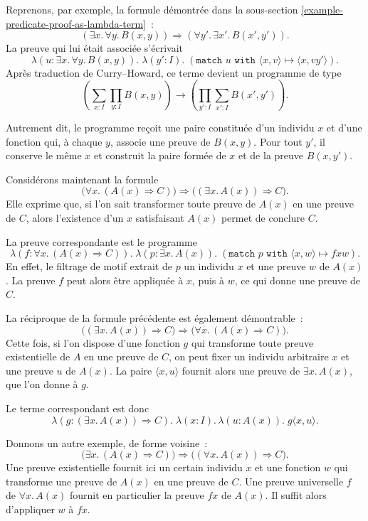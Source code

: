 \thingy
Reprenons, par exemple, la formule démontrée dans la sous-section
\ref{example-predicate-proof-as-lambda-term} :
\[
(\exists x.\,\forall y.\,B(x,y))
\Rightarrow
(\forall y'.\,\exists x'.\,B(x',y')).
\]
La preuve qui lui était associée s'écrivait
\[
\lambda(u:\exists x.\,\forall y.\,B(x,y)).\;
\lambda(y':I).\;
(\texttt{match~}u\texttt{~with~}\langle x,v\rangle\mapsto
\langle x,vy'\rangle).
\]
Après traduction de Curry--Howard, ce terme devient un programme de
type
\[
\left(
  \sum_{x:I}\prod_{y:I} B(x,y)
\right)
\rightarrow
\left(
  \prod_{y':I}\sum_{x':I} B(x',y')
\right).
\]

Autrement dit, le programme reçoit une paire constituée d'un individu
$x$ et d'une fonction qui, à chaque $y$, associe une preuve de
$B(x,y)$.  Pour tout $y'$, il conserve le même $x$ et construit la paire
formée de $x$ et de la preuve $B(x,y')$.

\thingy
Considérons maintenant la formule
\[
\bigl(\forall x.\,(A(x)\Rightarrow C)\bigr)
\Rightarrow
\bigl((\exists x.\,A(x))\Rightarrow C\bigr).
\]
Elle exprime que, si l'on sait transformer toute preuve de $A(x)$ en une
preuve de $C$, alors l'existence d'un $x$ satisfaisant $A(x)$ permet de
conclure $C$.

La preuve correspondante est le programme
\[
\lambda(f:\forall x.\,(A(x)\Rightarrow C)).\;
\lambda(p:\exists x.\,A(x)).\;
(\texttt{match~}p\texttt{~with~}\langle x,w\rangle\mapsto fxw).
\]
En effet, le filtrage de motif extrait de $p$ un individu $x$ et une
preuve $w$ de $A(x)$.  La preuve $f$ peut alors être appliquée à $x$,
puis à $w$, ce qui donne une preuve de $C$.

\thingy
La réciproque de la formule précédente est également démontrable :
\[
\bigl((\exists x.\,A(x))\Rightarrow C\bigr)
\Rightarrow
\bigl(\forall x.\,(A(x)\Rightarrow C)\bigr).
\]
Cette fois, si l'on dispose d'une fonction $g$ qui transforme toute
preuve existentielle de $A$ en une preuve de $C$, on peut fixer un
individu arbitraire $x$ et une preuve $u$ de $A(x)$.  La paire
$\langle x,u\rangle$ fournit alors une preuve de $\exists x.\,A(x)$,
que l'on donne à $g$.

Le terme correspondant est donc
\[
\lambda(g:(\exists x.\,A(x))\Rightarrow C).\;
\lambda(x:I).\,\lambda(u:A(x)).\;
g\langle x,u\rangle.
\]

\thingy
Donnons un autre exemple, de forme voisine :
\[
\bigl(\exists x.\,(A(x)\Rightarrow C)\bigr)
\Rightarrow
\bigl((\forall x.\,A(x))\Rightarrow C\bigr).
\]
Une preuve existentielle fournit ici un certain individu $x$ et une
fonction $w$ qui transforme une preuve de $A(x)$ en une preuve de $C$.
Une preuve universelle $f$ de $\forall x.\,A(x)$ fournit en particulier
la preuve $fx$ de $A(x)$.  Il suffit alors d'appliquer $w$ à $fx$.

